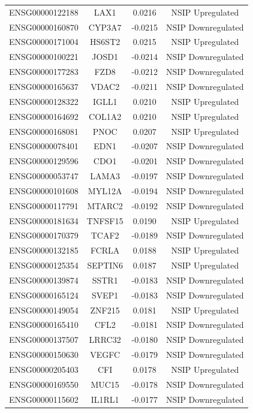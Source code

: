 \documentclass[
]{article}
\begin{document}
\begin{singlespace}
\begin{longtable}[t]{lccc}
ENSG00000122188 & LAX1 & 0.0216 & NSIP Upregulated\\
ENSG00000160870 & CYP3A7 & -0.0215 & NSIP Downregulated\\
ENSG00000171004 & HS6ST2 & 0.0215 & NSIP Upregulated\\
\addlinespace
ENSG00000100221 & JOSD1 & -0.0214 & NSIP Downregulated\\
ENSG00000177283 & FZD8 & -0.0212 & NSIP Downregulated\\
ENSG00000165637 & VDAC2 & -0.0211 & NSIP Downregulated\\
ENSG00000128322 & IGLL1 & 0.0210 & NSIP Upregulated\\
ENSG00000164692 & COL1A2 & 0.0210 & NSIP Upregulated\\
\addlinespace
ENSG00000168081 & PNOC & 0.0207 & NSIP Upregulated\\
ENSG00000078401 & EDN1 & -0.0207 & NSIP Downregulated\\
ENSG00000129596 & CDO1 & -0.0201 & NSIP Downregulated\\
ENSG00000053747 & LAMA3 & -0.0197 & NSIP Downregulated\\
ENSG00000101608 & MYL12A & -0.0194 & NSIP Downregulated\\
\addlinespace
ENSG00000117791 & MTARC2 & -0.0192 & NSIP Downregulated\\
ENSG00000181634 & TNFSF15 & 0.0190 & NSIP Upregulated\\
ENSG00000170379 & TCAF2 & -0.0189 & NSIP Downregulated\\
ENSG00000132185 & FCRLA & 0.0188 & NSIP Upregulated\\
ENSG00000125354 & SEPTIN6 & 0.0187 & NSIP Upregulated\\
\addlinespace
ENSG00000139874 & SSTR1 & -0.0183 & NSIP Downregulated\\
ENSG00000165124 & SVEP1 & -0.0183 & NSIP Downregulated\\
ENSG00000149054 & ZNF215 & 0.0181 & NSIP Upregulated\\
ENSG00000165410 & CFL2 & -0.0181 & NSIP Downregulated\\
ENSG00000137507 & LRRC32 & -0.0180 & NSIP Downregulated\\
\addlinespace
ENSG00000150630 & VEGFC & -0.0179 & NSIP Downregulated\\
ENSG00000205403 & CFI & 0.0178 & NSIP Upregulated\\
ENSG00000169550 & MUC15 & -0.0178 & NSIP Downregulated\\
ENSG00000115602 & IL1RL1 & -0.0177 & NSIP Downregulated\\

\end{longtable}
\end{singlespace}
\end{document}
